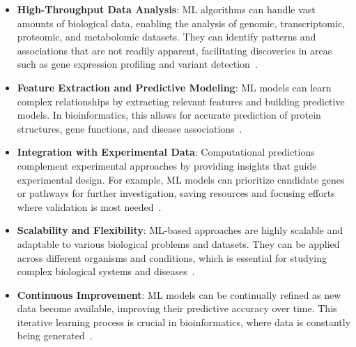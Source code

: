     \begin{itemize}
      \item \textbf{High-Throughput Data Analysis}: ML algorithms can handle vast amounts of biological data, enabling the analysis of genomic, transcriptomic, proteomic, and metabolomic datasets.
      They can identify patterns and associations that are not readily apparent, facilitating discoveries in areas such as gene expression profiling and variant detection~\cite{libbrecht_machine_2015}.

      \item \textbf{Feature Extraction and Predictive Modeling}: ML models can learn complex relationships by extracting relevant features and building predictive models.
      In bioinformatics, this allows for accurate prediction of protein structures, gene functions, and disease associations~\cite{chicco_machine_2020}.

      \item \textbf{Integration with Experimental Data}: Computational predictions complement experimental approaches by providing insights that guide experimental design.
      For example, ML models can prioritize candidate genes or pathways for further investigation, saving resources and focusing efforts where validation is most needed~\cite{larranaga_machine_2006}.

      \item \textbf{Scalability and Flexibility}: ML-based approaches are highly scalable and adaptable to various biological problems and datasets.
      They can be applied across different organisms and conditions, which is essential for studying complex biological systems and diseases~\cite{min_deep_2016}.

      \item \textbf{Continuous Improvement}: ML models can be continually refined as new data become available, improving their predictive accuracy over time.
      This iterative learning process is crucial in bioinformatics, where data is constantly being generated~\cite{esteva_guide_2019}.
    \end{itemize}

